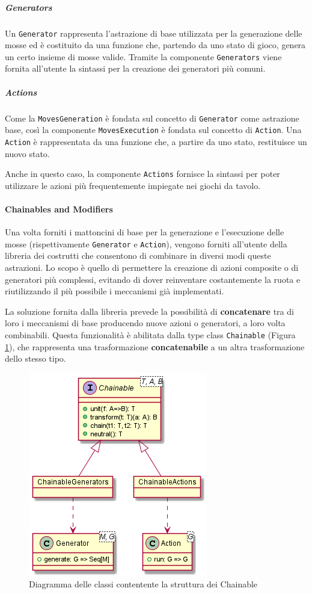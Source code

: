 \subparagraph{Generators}
Un \texttt{Generator} rappresenta l'astrazione di base utilizzata per la generazione delle mosse ed è costituito da una funzione che, partendo da uno stato di gioco, genera un certo insieme di mosse valide.
%
Tramite la componente \texttt{Generators} viene fornita all'utente la sintassi per la creazione dei generatori più comuni.

\subparagraph{Actions}
Come la \texttt{MovesGeneration} è fondata sul concetto di \texttt{Generator} come astrazione base, così la componente \texttt{MovesExecution} è fondata sul concetto di \texttt{Action}.
%
Una \texttt{Action} è rappresentata da una funzione che, a partire da uno stato, restituisce un nuovo stato.

Anche in questo caso, la componente \texttt{Actions} fornisce la sintassi per poter utilizzare le azioni più frequentemente impiegate nei giochi da tavolo.

\paragraph{Chainables and Modifiers}
Una volta forniti i mattoncini di base per la generazione e l'esecuzione delle mosse (rispettivamente \texttt{Generator} e \texttt{Action}), vengono forniti all'utente della libreria dei costrutti che consentono di combinare in diversi modi queste astrazioni.
%
Lo scopo è quello di permettere la creazione di azioni composite o di generatori più complessi, evitando di dover reinventare costantemente la ruota e riutilizzando il più possibile i meccanismi già implementati.

La soluzione fornita dalla libreria prevede la possibilità di \textbf{concatenare} tra di loro i meccanismi di base producendo nuove azioni o generatori, a loro volta combinabili. %
%
Questa funzionalità è abilitata dalla type class \texttt{Chainable} (Figura \ref{fig:chainables}), che rappresenta una trasformazione \textbf{concatenabile} a un altra trasformazione dello stesso tipo. %
%
\begin{figure}
    \centering
    \includegraphics[width=0.5\linewidth]{images/uml/chainables.png}
    \caption{Diagramma delle classi contentente la struttura dei Chainable}
    \label{fig:chainables}
\end{figure}

